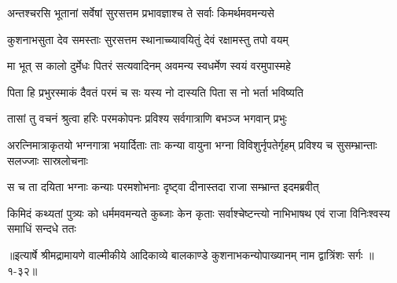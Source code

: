 \twolineshloka
{अन्तश्चरसि भूतानां सर्वेषां सुरसत्तम}
{प्रभावज्ञाश्च ते सर्वाः किमर्थमवमन्यसे} %

\twolineshloka
{कुशनाभसुता देव समस्ताः सुरसत्तम}
{स्थानाच्च्यावयितुं देवं रक्षामस्तु तपो वयम्} %

\twolineshloka
{मा भूत् स कालो दुर्मेधः पितरं सत्यवादिनम्}
{अवमन्य स्वधर्मेण स्वयं वरमुपास्महे} %

\twolineshloka
{पिता हि प्रभुरस्माकं दैवतं परमं च सः}
{यस्य नो दास्यति पिता स नो भर्ता भविष्यति} %

\twolineshloka
{तासां तु वचनं श्रुत्वा हरिः परमकोपनः}
{प्रविश्य सर्वगात्राणि बभञ्ज भगवान् प्रभुः} %

\threelineshloka
{अरत्निमात्राकृतयो भग्नगात्रा भयार्दिताः}
{ताः कन्या वायुना भग्ना विविशुर्नृपतेर्गृहम्}
{प्रविश्य च सुसम्भ्रान्ताः सलज्जाः सास्रलोचनाः} %

\twolineshloka
{स च ता दयिता भग्नाः कन्याः परमशोभनाः}
{दृष्ट्वा दीनास्तदा राजा सम्भ्रान्त इदमब्रवीत्} %

\threelineshloka
{किमिदं कथ्यतां पुत्र्यः को धर्ममवमन्यते}
{कुब्जाः केन कृताः सर्वाश्चेष्टन्त्यो नाभिभाषथ}
{एवं राजा विनिःश्वस्य समाधिं सन्दधे ततः} %


॥इत्यार्षे श्रीमद्रामायणे वाल्मीकीये आदिकाव्ये बालकाण्डे कुशनाभकन्योपाख्यानम् नाम द्वात्रिंशः सर्गः ॥१-३२॥
